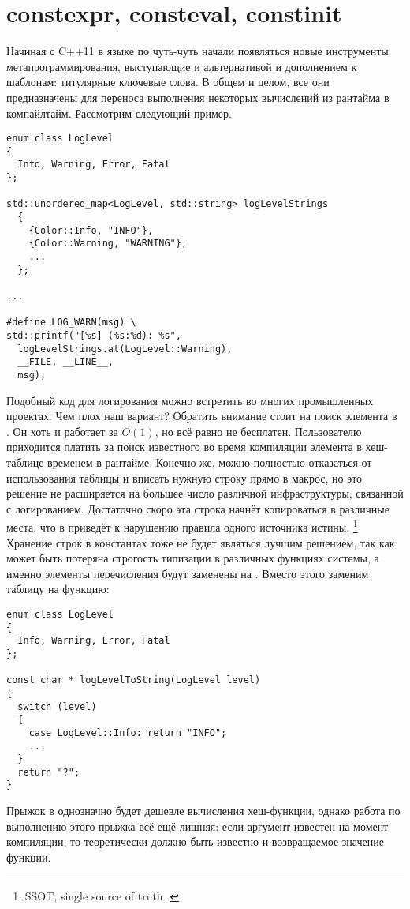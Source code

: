 \section{constexpr, consteval, constinit}
Начиная с C++11 в языке по чуть-чуть начали появляться новые инструменты метапрограммирования, выступающие и альтернативой и дополнением к шаблонам: титулярные ключевые слова.
В общем и целом, все они предназначены для переноса выполнения некоторых вычислений из рантайма в компайлтайм.
Рассмотрим следующий пример.
\begin{verbatim}
enum class LogLevel
{
  Info, Warning, Error, Fatal
};

std::unordered_map<LogLevel, std::string> logLevelStrings
  {
    {Color::Info, "INFO"},
    {Color::Warning, "WARNING"},
    ...
  };

...

#define LOG_WARN(msg) \
std::printf("[%s] (%s:%d): %s",
  logLevelStrings.at(LogLevel::Warning),
  __FILE, __LINE__,
  msg);
\end{verbatim}
Подобный код для логирования можно встретить во многих промышленных проектах.
Чем плох наш вариант? Обратить внимание стоит на поиск элемента в .
Он хоть и работает за $O(1)$, но всё равно не бесплатен.
Пользователю приходится платить за поиск известного во время компиляции элемента в хеш-таблице временем в рантайме.
Конечно же, можно полностью отказаться от использования таблицы и вписать нужную строку прямо в макрос, но это решение не расширяется на большее число различной инфраструктуры, связанной с логированием.
Достаточно скоро эта строка начнёт копироваться в различные места, что в приведёт к нарушению правила одного источника истины.
\footnote{SSOT, single source of truth \cite{ssotWiki}.}
Хранение строк в константах тоже не будет являться лучшим решением, так как может быть потеряна строгость типизации в различных функциях системы, а именно элементы перечисления будут заменены на .
Вместо этого заменим таблицу на функцию:
\begin{verbatim}
enum class LogLevel
{
  Info, Warning, Error, Fatal
};

const char * logLevelToString(LogLevel level)
{
  switch (level)
  {
    case LogLevel::Info: return "INFO";
    ...
  }
  return "?";
}
\end{verbatim}
Прыжок в  однозначно будет дешевле вычисления хеш-функции, однако работа по выполнению этого прыжка всё ещё лишняя: если аргумент  известен на момент компиляции, то теоретически должно быть известно и возвращаемое значение функции.
